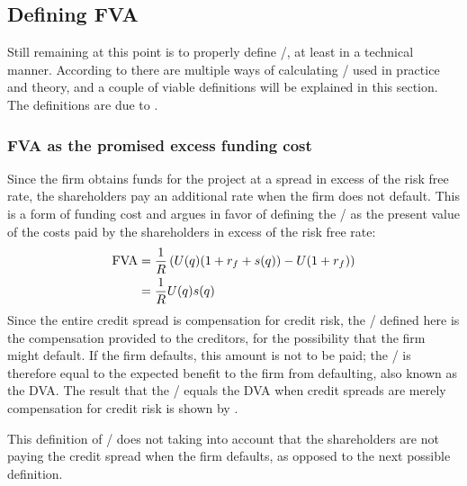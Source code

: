 \documentclass[../main.tex]{subfiles}
\begin{document}
    \subsection{Defining FVA}
        Still remaining at this point is to properly define \FVA/, at least in a technical manner.
        According to \cite{ADS2019} there are multiple ways of calculating \FVA/ used in practice and theory,
        and a couple of viable definitions will be explained in this section.
        The definitions are due to \cite{Hillion2016}.

        \subsubsection*{FVA as the promised excess funding cost}
            Since the firm obtains funds for the project at a spread in excess of the risk free rate, 
            the shareholders pay an additional rate when the firm does not default. 
            This is a form of funding cost and argues in favor of defining the \FVA/ as
            the present value of the costs paid by the shareholders in excess of the risk free rate:
                \begin{align}
                    \FVA/ 
                    &= 
                        \discountfactor \left(
                            U(q) (1 + \rfrate + s(q))
                            - U (1 + \rfrate)
                        \right) 
                        \nonumber \\
                    &= 
                        \discountfactor U(q) s(q)
                    \label{eqn:fva-as-promised-excess-funding-cost}
                \end{align}
            Since the entire credit spread is compensation for credit risk,
            the \FVA/ defined here is the compensation provided to the creditors,
            for the possibility that the firm might default. 
            If the firm defaults, this amount is not to be paid; 
            the \FVA/ is therefore equal to the expected benefit to the firm from defaulting, also known as the DVA. 
            The result that the \FVA/ equals the DVA when credit spreads are merely compensation for credit risk
            is shown by \cite{HullWhiteFVA}.

            This definition of \FVA/ does not taking into account 
            that the shareholders are not paying the credit spread when the firm defaults, 
            as opposed to the next possible definition.
\end{document}
